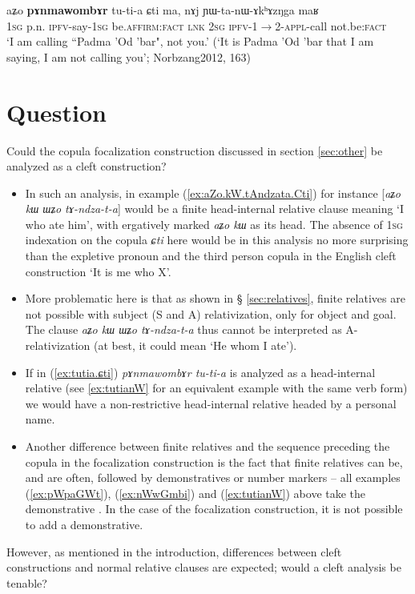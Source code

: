 \documentclass[oneside,a4paper,11pt]{article}
\newcommand{\ipa}[1]{{\phon{#1}}}
\newcommand{\fl}{$\rightarrow$}
\begin{document}
\begin{exe}
\ex \label{ex:tutia.ɕti}
\gll aʑo \textbf{pɤnmawombɤr} tu-ti-a ɕti ma, nɤj ɲɯ-ta-nɯ-ɤkʰɤzŋga maʁ  \\
\textsc{1sg} p.n. \textsc{ipfv}-say-\textsc{1sg} be.\textsc{affirm}:\textsc{fact} \textsc{lnk} \textsc{2sg} \textsc{ipfv}-1\fl{}2-\textsc{appl}-call not.be:\textsc{fact} \\
\glt `I am calling ``Padma 'Od 'bar", not you.' (`It is Padma 'Od 'bar that I am saying, I am not calling you'; Norbzang2012, 163)
\end{exe}

\section{Question}
Could the copula focalization construction discussed in section \ref{sec:other} be analyzed as a cleft construction? 
\begin{itemize}
\item In such an analysis, in example (\ref{ex:aZo.kW.tAndzata.Cti}) for instance  [\textit{aʑo kɯ ɯʑo tɤ-ndza-t-a}] would be a finite head-internal relative clause meaning `I who ate him', with ergatively marked \textit{aʑo kɯ} as its head. The absence of \textsc{1sg} indexation on the copula \textit{ɕti} here would be in this analysis no more surprising than the expletive pronoun and the third person copula in the English cleft construction `It is me who X'. 
\item More problematic here is that as shown in § \ref{sec:relatives}, finite relatives are not possible with subject (S and A) relativization, only for object and goal. The clause \textit{aʑo kɯ ɯʑo tɤ-ndza-t-a} thus cannot be interpreted as A-relativization (at best, it could mean `He whom I ate'). 
\item If in (\ref{ex:tutia.ɕti}) \textit{pɤnmawombɤr tu-ti-a} is analyzed as a head-internal relative (see \ref{ex:tutianW} for an equivalent example with the same verb form) we would have a non-restrictive head-internal relative headed by a personal name.
\item Another difference between finite relatives and the sequence preceding the copula in the focalization construction is the fact that finite relatives can be, and are often, followed by demonstratives or number markers -- all examples (\ref{ex:pWpaGWt}),  (\ref{ex:nWwGmbi}) and (\ref{ex:tutianW}) above take the demonstrative \ipa{nɯ}. In the case of the focalization construction, it is not possible to add a demonstrative.
\end{itemize}
However, as mentioned in the introduction, differences between cleft constructions and normal relative clauses are expected; would a cleft analysis be tenable?
\end{document}
